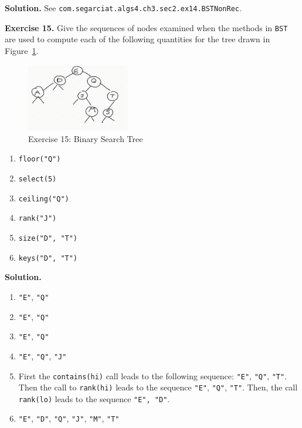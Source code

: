 \documentclass[12pt, a4paper]{article}
\newenvironment{ex}[2][Exercise]
{\par\medskip\noindent \textbf{#1 #2.}}
{\medskip}
\newenvironment{sol}[1][Solution]
{\par\medskip\noindent \textbf{#1.} }
{\medskip}
\begin{document}
	\begin{sol}
		See \texttt{com.segarciat.algs4.ch3.sec2.ex14.BSTNonRec}.
	\end{sol}
	\begin{ex}{15}
		Give the sequences of nodes examined when the methods in \texttt{BST} are used to
		compute each of the following quantities for the tree drawn in Figure~\ref{fig:ex-15}.
		\begin{figure}
			\centering
			\includegraphics[width=0.4\textwidth]{exercise-15}
			\caption{Exercise 15: Binary Search Tree}
			\label{fig:ex-15}
		\end{figure}
		\begin{enumerate}[label=(\alph*)]
			\item \texttt{floor("Q")}
			\item \texttt{select(5)}
			\item \texttt{ceiling("Q")}
			\item \texttt{rank("J")}
			\item \texttt{size("D", "T")}
			\item \texttt{keys("D", "T")}
		\end{enumerate}
	\end{ex}
	\begin{sol}
		\begin{enumerate}[label=(\alph*)]
			\item \texttt{"E"}, \texttt{"Q"}
			\item \texttt{"E"}, \texttt{"Q"}
			\item \texttt{"E"}, \texttt{"Q"}
			\item \texttt{"E"}, \texttt{"Q"}, \texttt{"J"}
			\item First the \texttt{contains(hi)} call leads to the following
			sequence: \texttt{"E"}, \texttt{"Q"}, \texttt{"T"}. Then the call
			to \texttt{rank(hi)} leads to the sequence \texttt{"E"}, \texttt{"Q"},
			\texttt{"T"}. Then, the call \texttt{rank(lo)} leads to the sequence
			\texttt{"E", "D"}.
			\item \texttt{"E"}, \texttt{"D"}, \texttt{"Q"}, \texttt{"J"}, \texttt{"M"},
			\texttt{"T"}
		\end{enumerate}
	\end{sol}
	\pagebreak
	\printbibliography
\end{document}
